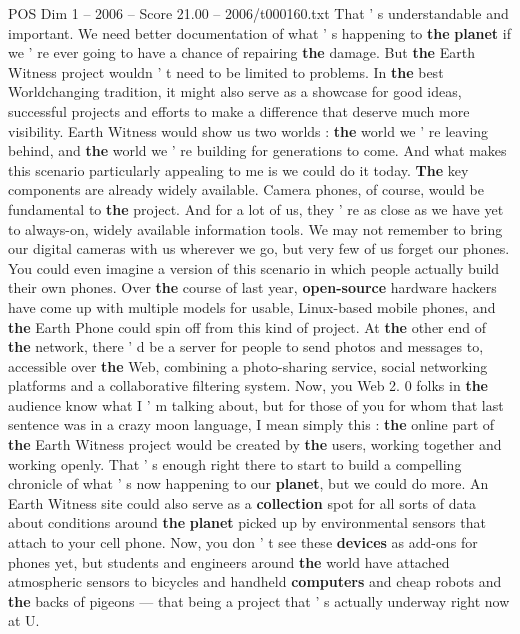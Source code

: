 \begin{textsample}{POS Dim 1 – 2006 – Score 21.00 – 2006/t000160.txt}
That ' s understandable and important.
We need better documentation of what ' s happening to \textbf{the} \textbf{planet} if we ' re ever going to have a chance of repairing \textbf{the} damage.
But \textbf{the} Earth Witness project wouldn ' t need to be limited to problems.
In \textbf{the} best Worldchanging tradition, it might also serve as a showcase for good ideas, successful projects and efforts to make a difference that deserve much more visibility.
Earth Witness would show us two worlds : \textbf{the} world we ' re leaving behind, and \textbf{the} world we ' re building for generations to come.
And what makes this scenario particularly appealing to me is we could do it today. \textbf{The} key components are already widely available.
Camera phones, of course, would be fundamental to \textbf{the} project.
And for a lot of us, they ' re as close as we have yet to always-on, widely available information tools.
We may not remember to bring our digital cameras with us wherever we go, but very few of us forget our phones.
You could even imagine a version of this scenario in which people actually build their own phones.
Over \textbf{the} course of last year, \textbf{open-source} hardware hackers have come up with multiple models for usable, Linux-based mobile phones, and \textbf{the} Earth Phone could spin off from this kind of project.
At \textbf{the} other end of \textbf{the} network, there ' d be a server for people to send photos and messages to, accessible over \textbf{the} Web, combining a photo-sharing service, social networking platforms and a collaborative filtering system.
Now, you Web 2. 0 folks in \textbf{the} audience know what I ' m talking about, but for those of you for whom that last sentence was in a crazy moon language, I mean simply this : \textbf{the} online part of \textbf{the} Earth Witness project would be created by \textbf{the} users, working together and working openly.
That ' s enough right there to start to build a compelling chronicle of what ' s now happening to our \textbf{planet}, but we could do more.
An Earth Witness site could also serve as a \textbf{collection} spot for all sorts of data about conditions around \textbf{the} \textbf{planet} picked up by environmental sensors that attach to your cell phone.
Now, you don ' t see these \textbf{devices} as add-ons for phones yet, but students and engineers around \textbf{the} world have attached atmospheric sensors to bicycles and handheld \textbf{computers} and cheap robots and \textbf{the} backs of pigeons — that being a project that ' s actually underway right now at U.

\end{textsample}
